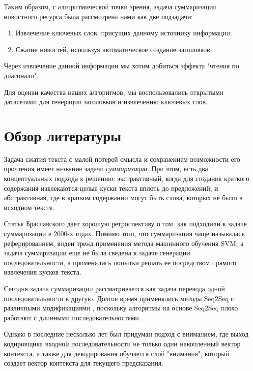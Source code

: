 \documentclass[14pt]{matmex-diploma-custom}
\begin{document}
Таким образом, с алгоритмической точки зрения, задача суммаризации новостного ресурса была рассмотрена нами как две подзадачи:
\begin{enumerate}
  \item Извлечение ключевых слов, присущих данному источнику информации;
  \item Сжатие новостей, используя автоматическое создание заголовков.
\end{enumerate}

Через извлечение данной информации мы хотим добиться эффекта "чтения по диагонали".

Для оценки качества наших алгоритмов, мы воспользовались открытыми датасетами для генерации заголовков и извлечению ключевых слов.

\section{Обзор литературы}
Задача сжатия текста с малой потерей смысла и сохранением возможности его прочтения
имеет название задачи \textit{суммаризации}. При этом, есть два концептуальных подхода к решению:
экстрактивный, когда для создания краткого содержания извлекаются целые куски текста вплоть до предложений,
и абстрактивная, где в кратком содержании могут быть слова, которых не было в исходном тексте.

Статья Браславского \cite{braslavski_gustelev} дает хорошую ретроспективу о том, как подходили к задаче суммаризации в 2000-х годах. Помимо того, что суммаризация чаще называлась реферированием, виден тренд применения метода машинного обучения SVM, а задача суммаризации еще не была сведена к задаче генерации последовательности, а применялись попытки решать ее посредством прямого извлечения кусков текста. 

Сегодня задача суммаризации рассматривается как задача перевода одной последовательности в другую. Долгое время применялись методы Seq2Seq с различными модификациями \cite{Putra2018IncorporatingTS}, поскольку алгоритмы на основе Seq2Seq плохо работают с длинными последовательностями.

Однако в последние несколько лет был придуман подход с вниманием, где выход кодировщика входной последовательности не только один накопленный вектор контекста, а также для декодирования обучается слой "внимания", который создает вектор контекста для текущего предсказания.
\end{document}
